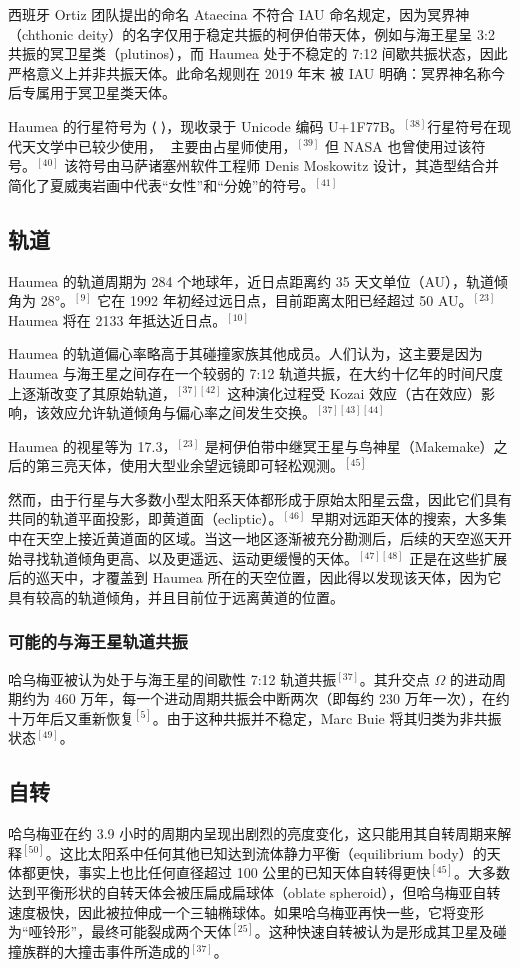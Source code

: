 西班牙 Ortiz 团队提出的命名 Ataecina 不符合 IAU 命名规定，因为冥界神（chthonic deity）的名字仅用于稳定共振的柯伊伯带天体，例如与海王星呈 3:2 共振的冥卫星类（plutinos），而 Haumea 处于不稳定的 7:12 间歇共振状态，因此严格意义上并非共振天体。此命名规则在 2019 年末 被 IAU 明确：冥界神名称今后专属用于冥卫星类天体。

Haumea 的行星符号为 ⟨🝻⟩，现收录于 Unicode 编码 U+1F77B。$^{[38]}$行星符号在现代天文学中已较少使用，🝻 主要由占星师使用，$^{[39]}$ 但 NASA 也曾使用过该符号。$^{[40]}$
该符号由马萨诸塞州软件工程师 Denis Moskowitz 设计，其造型结合并简化了夏威夷岩画中代表“女性”和“分娩”的符号。$^{[41]}$
\subsection{轨道}
Haumea 的轨道周期为 284 个地球年，近日点距离约 35 天文单位（AU），轨道倾角为 28°。$^{[9]}$ 它在 1992 年初经过远日点，目前距离太阳已经超过 50 AU。$^{[23]}$ Haumea 将在 2133 年抵达近日点。$^{[10]}$

Haumea 的轨道偏心率略高于其碰撞家族其他成员。人们认为，这主要是因为 Haumea 与海王星之间存在一个较弱的 7:12 轨道共振，在大约十亿年的时间尺度上逐渐改变了其原始轨道，$^{[37][42]}$ 这种演化过程受 Kozai 效应（古在效应）影响，该效应允许轨道倾角与偏心率之间发生交换。$^{[37][43][44]}$

Haumea 的视星等为 17.3，$^{[23]}$ 是柯伊伯带中继冥王星与鸟神星（Makemake）之后的第三亮天体，使用大型业余望远镜即可轻松观测。$^{[45]}$

然而，由于行星与大多数小型太阳系天体都形成于原始太阳星云盘，因此它们具有共同的轨道平面投影，即黄道面（ecliptic）。$^{[46]}$ 早期对远距天体的搜索，大多集中在天空上接近黄道面的区域。当这一地区逐渐被充分勘测后，后续的天空巡天开始寻找轨道倾角更高、以及更遥远、运动更缓慢的天体。$^{[47][48]}$ 正是在这些扩展后的巡天中，才覆盖到 Haumea 所在的天空位置，因此得以发现该天体，因为它具有较高的轨道倾角，并且目前位于远离黄道的位置。
\subsubsection{可能的与海王星轨道共振}
哈乌梅亚被认为处于与海王星的间歇性 7:12 轨道共振$^{[37]}$。其升交点 $\Omega$ 的进动周期约为 460 万年，每一个进动周期共振会中断两次（即每约 230 万年一次），在约十万年后又重新恢复$^{[5]}$。由于这种共振并不稳定，Marc Buie 将其归类为非共振状态$^{[49]}$。
\subsection{自转}
哈乌梅亚在约 3.9 小时的周期内呈现出剧烈的亮度变化，这只能用其自转周期来解释$^{[50]}$。这比太阳系中任何其他已知达到流体静力平衡（equilibrium body）的天体都更快，事实上也比任何直径超过 100 公里的已知天体自转得更快$^{[45]}$。大多数达到平衡形状的自转天体会被压扁成扁球体（oblate spheroid），但哈乌梅亚自转速度极快，因此被拉伸成一个三轴椭球体。如果哈乌梅亚再快一些，它将变形为“哑铃形”，最终可能裂成两个天体$^{[25]}$。这种快速自转被认为是形成其卫星及碰撞族群的大撞击事件所造成的$^{[37]}$。

